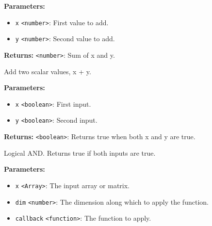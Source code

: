 \documentclass[12pt,a4paper]{article}
\begin{document}
\vspace{5mm}
\noindent {}


\noindent \textbf{Parameters:}
\begin{itemize}
  \item \texttt{x} \texttt{<number>}: First value to add.
  \item \texttt{y} \texttt{<number>}: Second value to add.
\end{itemize}

\noindent \textbf{Returns:} \texttt{<number>}: Sum of \textasciigrave{}x\textasciigrave{} and \textasciigrave{}y\textasciigrave{}.

\noindent Add two scalar values, \textasciigrave{}x + y\textasciigrave{}.

\vspace{5mm}
\noindent {}


\noindent \textbf{Parameters:}
\begin{itemize}
  \item \texttt{x} \texttt{<boolean>}: First input.
  \item \texttt{y} \texttt{<boolean>}: Second input.
\end{itemize}

\noindent \textbf{Returns:} \texttt{<boolean>}: Returns true when both \textasciigrave{}x\textasciigrave{} and \textasciigrave{}y\textasciigrave{} are true.

\noindent Logical AND. Returns true if both inputs are true.

\vspace{5mm}
\noindent {}


\noindent \textbf{Parameters:}
\begin{itemize}
  \item \texttt{x} \texttt{<Array>}: The input array or matrix.
  \item \texttt{dim} \texttt{<number>}: The dimension along which to apply the function.
  \item \texttt{callback} \texttt{<function>}: The function to apply.
\end{itemize}
\end{document}
